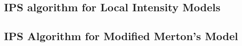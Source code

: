 \subsection{IPS algorithm for Local Intensity Models}

\subsection{IPS Algorithm for Modified Merton's Model}
